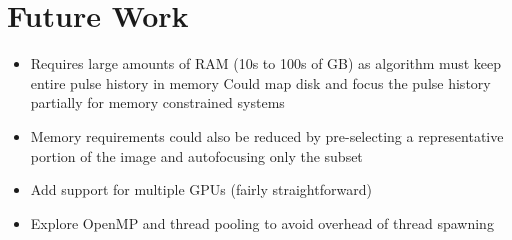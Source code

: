\section{Future Work}\label{sec:futurework}

\begin{itemize}
  \item Requires large amounts of RAM (10s to 100s of GB)  as algorithm must keep entire pulse history in memory
    \subitem Could map disk and focus the pulse history partially for memory constrained systems
  \item Memory requirements could also be reduced by pre-selecting a representative portion of the image and autofocusing only the subset
  \item Add support for multiple GPUs (fairly straightforward)
  \item Explore OpenMP and thread pooling to avoid overhead of thread spawning
\end{itemize}
